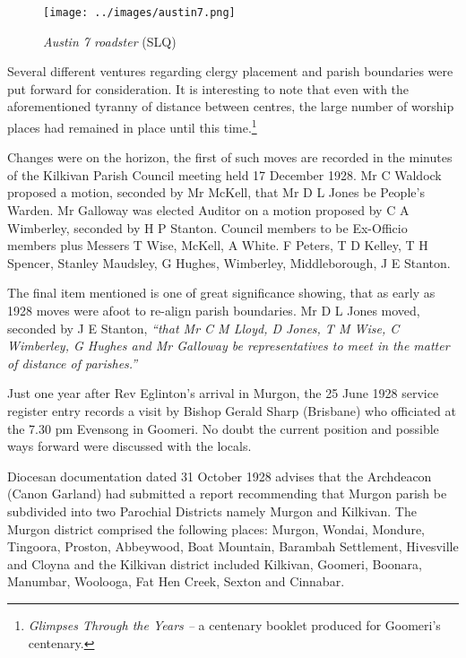 \begin{figure}[!htb]
\begin{center}
\texttt{[image: ../images/austin7.png]}
\caption{{\itshape Austin 7 roadster} {\scriptsize(SLQ)}}
\end{center}
\end{figure}




Several different ventures regarding clergy placement and parish boundaries were put forward for consideration. It is interesting to note that even with the aforementioned tyranny of distance between centres, the large number of worship places had remained in place until this time.\footnote{\emph{Glimpses Through the Years --} a centenary booklet produced for Goomeri's centenary.}


Changes were on the horizon, the first of such moves are recorded in the minutes of the Kilkivan Parish Council meeting held 17 December 1928. Mr C Waldock proposed a motion, seconded by Mr McKell, that Mr D L Jones be People's Warden. Mr Galloway was elected Auditor on a motion proposed by C A Wimberley, seconded by H P Stanton. Council members to be Ex-Officio members plus Messers T Wise, McKell, A White. F Peters, T D Kelley, T H Spencer, Stanley Maudsley, G Hughes, Wimberley, Middleborough, J E Stanton.



The final item mentioned is one of great significance showing, that as early as 1928 moves were afoot to re-align parish boundaries. Mr D L Jones moved, seconded by J E Stanton, \emph{``that Mr C M Lloyd, D Jones, T M Wise, C Wimberley, G Hughes and Mr Galloway be representatives to meet in the matter of distance of parishes.''}



Just one year after Rev Eglinton's arrival in Murgon, the 25 June 1928 service register entry records a visit by Bishop Gerald Sharp (Brisbane) who officiated at the 7.30 pm Evensong in Goomeri. No doubt the current position and possible ways forward were discussed with the locals.



Diocesan documentation dated 31 October 1928 advises that the Archdeacon (Canon Garland) had submitted a report recommending that Murgon parish be subdivided into two Parochial Districts namely Murgon and Kilkivan. The Murgon district comprised the following places: Murgon, Wondai, Mondure, Tingoora, Proston, Abbeywood, Boat Mountain, Barambah Settlement, Hivesville and Cloyna and the Kilkivan district included Kilkivan, Goomeri, Boonara, Manumbar, Woolooga, Fat Hen Creek, Sexton and Cinnabar.



